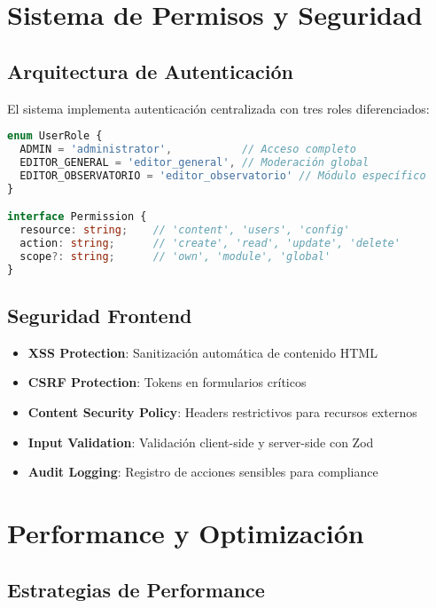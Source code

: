 \documentclass[12pt,a4paper]{article}
\begin{document}
\section{Sistema de Permisos y Seguridad}

\subsection{Arquitectura de Autenticación}

El sistema implementa autenticación centralizada con tres roles diferenciados:

\begin{lstlisting}[language=typescript, caption=Sistema de Roles y Permisos]
enum UserRole {
  ADMIN = 'administrator',           // Acceso completo
  EDITOR_GENERAL = 'editor_general', // Moderación global
  EDITOR_OBSERVATORIO = 'editor_observatorio' // Módulo específico
}

interface Permission {
  resource: string;    // 'content', 'users', 'config'
  action: string;      // 'create', 'read', 'update', 'delete'
  scope?: string;      // 'own', 'module', 'global'
}
\end{lstlisting}

\subsection{Seguridad Frontend}

\begin{itemize}
    \item \textbf{XSS Protection}: Sanitización automática de contenido HTML
    \item \textbf{CSRF Protection}: Tokens en formularios críticos
    \item \textbf{Content Security Policy}: Headers restrictivos para recursos externos
    \item \textbf{Input Validation}: Validación client-side y server-side con Zod
    \item \textbf{Audit Logging}: Registro de acciones sensibles para compliance
\end{itemize}

\section{Performance y Optimización}

\subsection{Estrategias de Performance}
\end{document}
